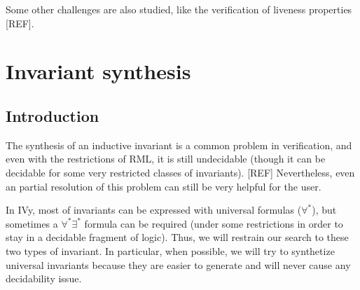\documentclass[11pt,a4paper,oldfontcommands,openany]{memoir}
\begin{document}
    Some other challenges are also studied, like the verification of liveness properties [REF].


\chapter{Invariant synthesis}

    \section{Introduction}

    The synthesis of an inductive invariant is a common problem in verification, and even with the restrictions of RML, it is still undecidable (though it can be decidable for some very restricted classes of invariants). [REF]
    Nevertheless, even an partial resolution of this problem can still be very helpful for the user.

    In IVy, most of invariants can be expressed with universal formulas (\(\forall^*\)), but sometimes a \(\forall^*\exists^*\) formula can be required (under some restrictions in order
    to stay in a decidable fragment of logic). Thus, we will restrain our search to these two types of invariant.
    In particular, when possible, we will try to synthetize universal invariants because they are easier to generate and will never cause any decidability issue.
    
\end{document}
